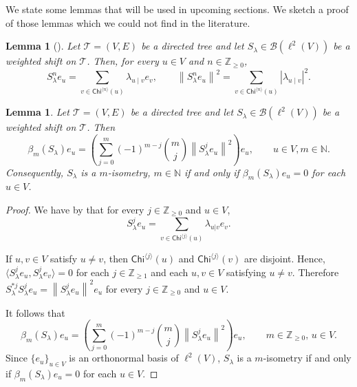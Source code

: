 \documentclass[11pt, reqno, a4paper]{amsart}
\newtheorem{lemma}[theorem]{Lemma}
\theoremstyle{definition}
\newcommand{\calB}{{\mathcal{B}}}
\newcommand{\scrT}{{\mathscr T}}
\newcommand{\norm}[1]{\left\lVert #1 \right\rVert}
\newcommand{\abs}[1]{\left\lvert #1 \right\rvert}
\renewcommand{\ge}{\geqslant}
\renewcommand{\geq}{\geqslant}
\newcommand{\N}{\mathbb N}
\newcommand{\Z}{\mathbb Z}
\newcommand{\Chi}{\mathsf{Chi}}
\numberwithin{equation}{section}
\begin{document}
We state some lemmas that will be used in upcoming sections. We sketch a proof of those lemmas which we could not find in the literature.

\begin{lemma}[{\cite[Lemma 6.1.1]{MR2919910}}]
    \label{lem:JJS-powers}
Let $\scrT=( V, E)$ be a directed tree and let $S_\lambda\in\calB(\ell^2( V))$ be a weighted shift on $\scrT$. Then, for every $u\in V$ and $n\in\Z_{\geq0}$,
\begin{equation*}
    S_\lambda^n e_u = \sum_{v\in\Chi^{\langle n\rangle}(u)} \lambda_{u\mid v}e_v, \qquad \norm{S_\lambda^n e_u}^2 = \sum_{v\in\Chi^{\langle n\rangle}(u)} \abs{\lambda_{u\mid v}}^2.
    \end{equation*}
\end{lemma}

\begin{lemma}
    \label{lem:compute-beta-m}
    Let $\scrT = ( V,  E)$ be a directed tree and let $S_{\lambda} \in \calB (\ell ^2 ( V))$ be a weighted shift on $\scrT$. Then
    \begin{equation*}
        \beta_{m} (S_{\lambda}) e_u = \left( \sum_{j=0}^{m} (-1)^{m-j} \binom{m}{j} \norm{S_{\lambda}^{j}e_u }^{2} \right) e_u, \qquad u \in V, m \in \N.
    \end{equation*}
    Consequently, $S_{\lambda}$ is a $m$-isometry, $m \in \N$ if and only if $\beta_{m} (S_{\lambda}) e_u = 0$ for each $u \in  V$.
\end{lemma}
\begin{proof}
 We have by  that for every $j\in \Z_{\ge 0}$ and $u\in V$,
\begin{equation*}
S_\lambda^j e_u = \sum_{v\in\Chi^{\langle j\rangle}(u)} \lambda_{u|v}e_v.
\end{equation*}

If $u, v \in  V$ satisfy $u\neq v$, then $\Chi^{\langle j\rangle}(u)$ and $\Chi^{\langle j\rangle}(v)$ are disjoint. Hence, $\langle S_\lambda^j e_u,S_\lambda^j e_v\rangle=0$ for each $j \in \Z_{\ge 1}$ and each $u, v \in  V$ satisfying $u \ne v$. Therefore $S_\lambda^{*j}S_\lambda^j e_u = \norm{S_\lambda^j e_u}^2e_u$ for every $j\in\Z_{\ge0}$ and $u\in V$.

It follows that
\begin{equation*}
\beta_m(S_\lambda)e_u = \left( \sum_{j=0}^{m}(-1)^{m-j}\binom{m}{j} \norm{S_\lambda^j e_u}^2 \right)e_u, \qquad m \in \Z_{\ge 0},\, u \in  V.
\end{equation*}
Since $\{e_u\}_{u\in V}$ is an orthonormal basis of $\ell^2(V)$,
 $S_{\lambda}$ is a $m$-isometry if and only if $\beta_{m} (S_{\lambda}) e_u = 0$ for each $u \in  V$.
\end{proof}
\end{document}
